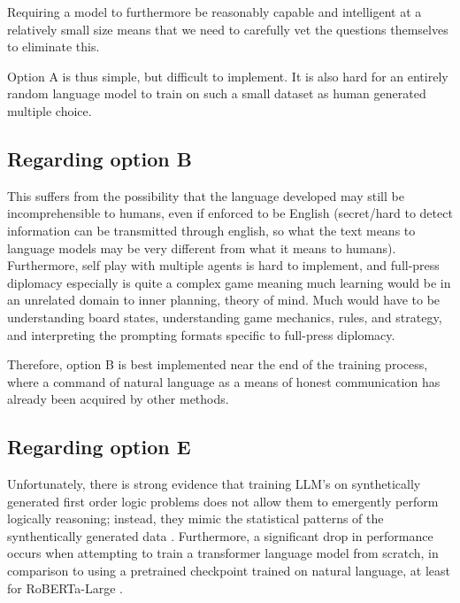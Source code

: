 \documentclass{article}
\begin{document}
Requiring a model to furthermore be reasonably capable and intelligent at a relatively small size means that we need to carefully vet the questions themselves to eliminate this.

Option A is thus simple, but difficult to implement. It is also hard for an entirely random language model to train on such a small dataset as human generated multiple choice.


\subsection{Regarding option B}

This suffers from the possibility that the language developed may still be incomprehensible to humans, even if enforced to be English (secret/hard to detect information can be transmitted through english, so what the text means to language models may be very different from what it means to humans). Furthermore, self play with multiple agents is hard to implement, and full-press diplomacy especially is quite a complex game meaning much learning would be in an unrelated domain to inner planning, theory of mind. Much would have to be understanding board states, understanding game mechanics, rules, and strategy, and interpreting the prompting formats specific to full-press diplomacy.

Therefore, option B is best implemented near the end of the training process, where a command of natural language as a means of honest communication has already been acquired by other methods.

\subsection{Regarding option E}
Unfortunately, there is strong evidence that training LLM's on synthetically generated first order logic problems does not allow them to emergently perform logically reasoning; instead, they mimic the statistical patterns of the synthentically generated data \citep{pirozelli2023assessing}. Furthermore, a significant drop in performance occurs when attempting to train a transformer language model from scratch, in comparison to using a pretrained checkpoint trained on natural language, at least for RoBERTa-Large \citep{han2022folio}.
\end{document}
